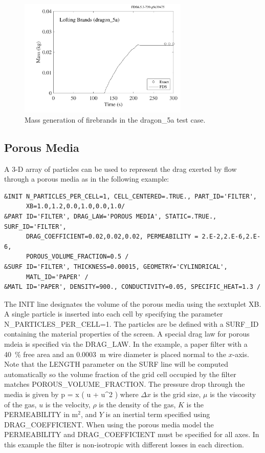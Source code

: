 \documentclass[11pt]{book}
\begin{document}
\begin{figure}[ht]
\begin{center}
\includegraphics[height=2.2in]{SCRIPT_FIGURES/dragon_5a}
\end{center}
\caption[Mass generation of firebrands in the {\ct dragon\_5a} test case]{Mass generation of firebrands in the {\ct dragon\_5a} test case.}
\label{dragon_5a}
\end{figure}

\subsection{Porous Media}
\label{info:porous_media}

A 3-D array of particles can be used to represent the drag exerted by flow through a porous media as in the following example:
\begin{lstlisting}
&INIT N_PARTICLES_PER_CELL=1, CELL_CENTERED=.TRUE., PART_ID='FILTER',
      XB=1.0,1.2,0.0,1.0,0.0,1.0/
&PART ID='FILTER', DRAG_LAW='POROUS MEDIA', STATIC=.TRUE., SURF_ID='FILTER',
      DRAG_COEFFICIENT=0.02,0.02,0.02, PERMEABILITY = 2.E-2,2.E-6,2.E-6,
      POROUS_VOLUME_FRACTION=0.5 /
&SURF ID='FILTER', THICKNESS=0.00015, GEOMETRY='CYLINDRICAL',
      MATL_ID='PAPER' /
&MATL ID='PAPER', DENSITY=900., CONDUCTIVITY=0.05, SPECIFIC_HEAT=1.3 /
\end{lstlisting}
The {\ct INIT} line designates the volume of the porous media using the sextuplet {\ct XB}. A single particle is inserted into each cell by specifying the parameter {\ct N\_PARTICLES\_PER\_CELL=1}.  The particles are be defined with a {\ct SURF\_ID} containing the material properties of the screen.  A special drag law for porous mdeia is specified via the {\ct DRAG\_LAW}.  In the example, a paper filter with a 40~\% free area and an 0.0003~m wire diameter is placed normal to the $x$-axis.  Note that the {\ct LENGTH} parameter on the {\ct SURF} line will be computed automatically so the volume fraction of the grid cell occupied by the filter matches {\ct POROUS\_VOLUME\_FRACTION}. The pressure drop through the media is given by
\be
   \Delta p =  \Delta x \; \left( u + \rho {} u^2 \right)
\ee
where $\Delta x$ is the grid size, $\mu$ is the viscosity of the gas, $u$ is the velocity, $\rho$ is the density of the gas, $K$ is the {\ct PERMEABILITY} in m$^2$, and $Y$ is an inertial term specified using {\ct DRAG\_COEFFICIENT}.  When using the porous media model the {\ct PERMEABILITY} and {\ct DRAG\_COEFFICIENT} must be specified for all axes.  In this example the filter is non-isotropic with different losses in each direction.
\end{document}
